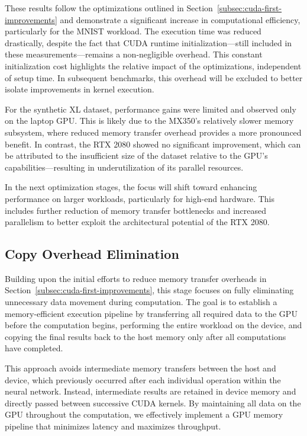 \documentclass[modern,longauthor]{aastex7}
\begin{document}
These results follow the optimizations outlined in Section~\ref{subsec:cuda-first-improvements} and demonstrate a significant increase in computational efficiency, particularly for the MNIST workload. The execution time was reduced drastically, despite the fact that CUDA runtime initialization—still included in these measurements—remains a non-negligible overhead. This constant initialization cost highlights the relative impact of the optimizations, independent of setup time. In subsequent benchmarks, this overhead will be excluded to better isolate improvements in kernel execution.

For the synthetic XL dataset, performance gains were limited and observed only on the laptop GPU. This is likely due to the MX350’s relatively slower memory subsystem, where reduced memory transfer overhead provides a more pronounced benefit. In contrast, the RTX 2080 showed no significant improvement, which can be attributed to the insufficient size of the dataset relative to the GPU’s capabilities—resulting in underutilization of its parallel resources.

In the next optimization stages, the focus will shift toward enhancing performance on larger workloads, particularly for high-end hardware. This includes further reduction of memory transfer bottlenecks and increased parallelism to better exploit the architectural potential of the RTX 2080.
\subsection{Copy Overhead Elimination}\label{subsec:eliminate-copy-overhead}
Building upon the initial efforts to reduce memory transfer overheads in Section~\ref{subsec:cuda-first-improvements}, this stage focuses on fully eliminating unnecessary data movement during computation. The goal is to establish a memory-efficient execution pipeline by transferring all required data to the GPU before the computation begins, performing the entire workload on the device, and copying the final results back to the host memory only after all computations have completed.

This approach avoids intermediate memory transfers between the host and device, which previously occurred after each individual operation within the neural network. Instead, intermediate results are retained in device memory and directly passed between successive CUDA kernels. By maintaining all data on the GPU throughout the computation, we effectively implement a GPU memory pipeline that minimizes latency and maximizes throughput.
\end{document}
